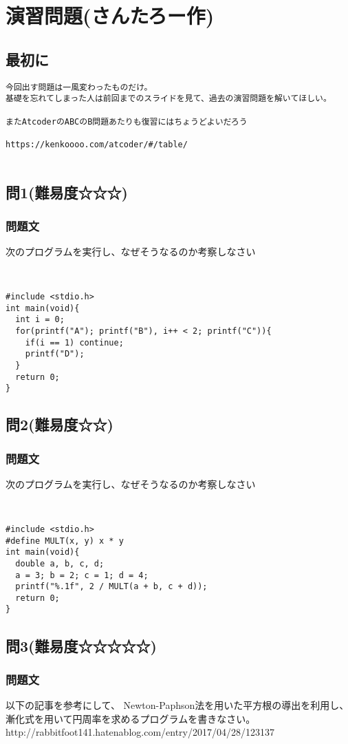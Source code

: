 \section{演習問題(さんたろー作)}
\subsection{最初に}
\begin{verbatim}
今回出す問題は一風変わったものだけ。
基礎を忘れてしまった人は前回までのスライドを見て、過去の演習問題を解いてほしい。

またAtcoderのABCのB問題あたりも復習にはちょうどよいだろう

https://kenkoooo.com/atcoder/#/table/


\end{verbatim}
\subsection{問1(難易度☆☆☆)}
\subsubsection{問題文}
次のプログラムを実行し、なぜそうなるのか考察しなさい
\begin{verbatim}


#include <stdio.h>
int main(void){
  int i = 0;
  for(printf("A"); printf("B"), i++ < 2; printf("C")){
    if(i == 1) continue;
    printf("D");
  }
  return 0;
}
\end{verbatim}

\subsection{問2(難易度☆☆)}
\subsubsection{問題文}
次のプログラムを実行し、なぜそうなるのか考察しなさい
\begin{verbatim}


#include <stdio.h>
#define MULT(x, y) x * y
int main(void){
  double a, b, c, d;
  a = 3; b = 2; c = 1; d = 4;
  printf("%.1f", 2 / MULT(a + b, c + d));
  return 0;
}
\end{verbatim}

\subsection{問3(難易度☆☆☆☆☆)}
\subsubsection{問題文}
以下の記事を参考にして、
Newton-Paphson法を用いた平方根の導出を利用し、
漸化式を用いて円周率を求めるプログラムを書きなさい。\\

http://rabbitfoot141.hatenablog.com/entry/2017/04/28/123137
